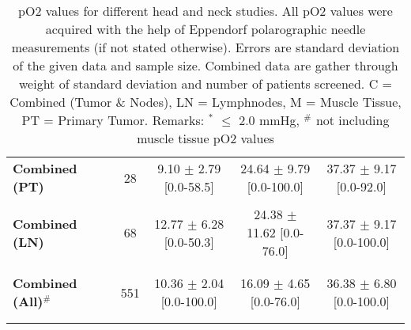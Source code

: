 \begin{sidewaystable}[p]
\begin{tabular}{lccccc}
\textbf{Combined (PT)} & & 28 & 9.10 $\pm$ 2.79 [0.0-58.5] & 24.64 $\pm$ 9.79 [0.0-100.0] & 37.37 $\pm$ 9.17 [0.0-92.0]\\\\
\textbf{Combined (LN)} & & 68 & 12.77 $\pm$ 6.28 [0.0-50.3] & 24.38 $\pm$ 11.62 [0.0-76.0] & 37.37 $\pm$ 9.17 [0.0-100.0]\\\\
\bottomrule\\
\textbf{Combined (All)}$^\#$ & & 551 & 10.36 $\pm$ 2.04 [0.0-100.0] & 16.09 $\pm$ 4.65 [0.0-76.0] & 36.38 $\pm$ 6.80 [0.0-100.0]\\\\\\
\end{tabular}
\caption{pO2 values for different head and neck studies. All pO2 values were acquired with the help of Eppendorf polarographic needle measurements (if not stated otherwise). Errors are standard deviation of the given data and sample size. Combined data are gather through weight of standard deviation and number of patients screened. C = Combined (Tumor \& Nodes), LN = Lymphnodes, M = Muscle Tissue, PT = Primary Tumor. Remarks: $^*$ $\leq$ 2.0 mmHg, $^\#$ not including muscle tissue pO2 values}
\label{tab:po2parameter}
\end{sidewaystable}
